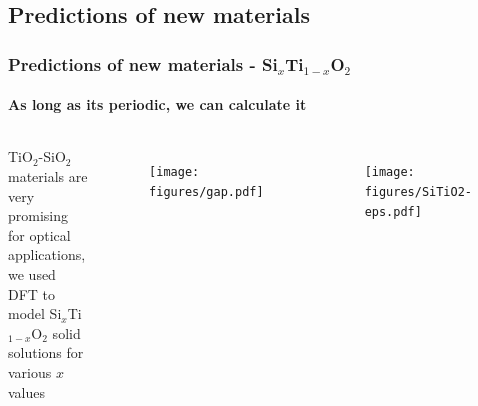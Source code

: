 \documentclass{beamer}
\begin{document}
\subsection{Predictions of new materials}
\begin{frame}
    \frametitle{Predictions of new materials - Si$_x$Ti$_{1-x}$O$_2$}
    \framesubtitle{As long as its periodic, we can calculate it}

	\begin{columns}[c]
     TiO$_2$-SiO$_2$ materials are very promising for optical applications, we used DFT to model Si$_x$Ti$_{1-x}$O$_2$ solid solutions for various $x$ values

    \begin{figure}
	\texttt{[image: figures/gap.pdf]}
	\end{figure}

    \begin{figure}
	\texttt{[image: figures/SiTiO2-eps.pdf]}
	\end{figure}

    \end{columns}
\end{frame}
\end{document}
